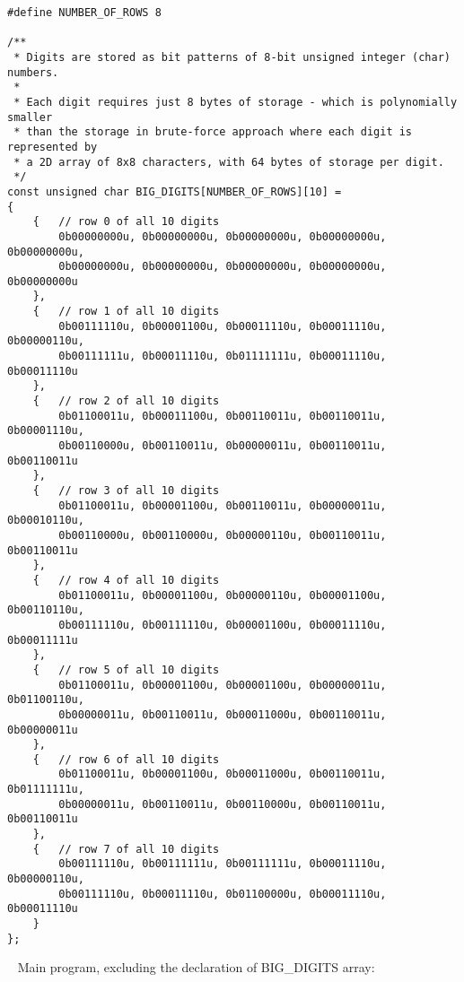 \documentclass{article}
\begin{document}
	\begin{verbatim}
#define NUMBER_OF_ROWS 8

/**
 * Digits are stored as bit patterns of 8-bit unsigned integer (char) numbers.
 *
 * Each digit requires just 8 bytes of storage - which is polynomially smaller
 * than the storage in brute-force approach where each digit is represented by
 * a 2D array of 8x8 characters, with 64 bytes of storage per digit.
 */
const unsigned char BIG_DIGITS[NUMBER_OF_ROWS][10] = 
{
    {   // row 0 of all 10 digits
        0b00000000u, 0b00000000u, 0b00000000u, 0b00000000u, 0b00000000u,
        0b00000000u, 0b00000000u, 0b00000000u, 0b00000000u, 0b00000000u
    },
    {   // row 1 of all 10 digits
        0b00111110u, 0b00001100u, 0b00011110u, 0b00011110u, 0b00000110u,
        0b00111111u, 0b00011110u, 0b01111111u, 0b00011110u, 0b00011110u
    },
    {   // row 2 of all 10 digits
        0b01100011u, 0b00011100u, 0b00110011u, 0b00110011u, 0b00001110u,
        0b00110000u, 0b00110011u, 0b00000011u, 0b00110011u, 0b00110011u
    },
    {   // row 3 of all 10 digits
        0b01100011u, 0b00001100u, 0b00110011u, 0b00000011u, 0b00010110u,
        0b00110000u, 0b00110000u, 0b00000110u, 0b00110011u, 0b00110011u
    },
    {   // row 4 of all 10 digits
        0b01100011u, 0b00001100u, 0b00000110u, 0b00001100u, 0b00110110u,
        0b00111110u, 0b00111110u, 0b00001100u, 0b00011110u, 0b00011111u
    },
    {   // row 5 of all 10 digits
        0b01100011u, 0b00001100u, 0b00001100u, 0b00000011u, 0b01100110u,
        0b00000011u, 0b00110011u, 0b00011000u, 0b00110011u, 0b00000011u
    },
    {   // row 6 of all 10 digits
        0b01100011u, 0b00001100u, 0b00011000u, 0b00110011u, 0b01111111u,
        0b00000011u, 0b00110011u, 0b00110000u, 0b00110011u, 0b00110011u
    },
    {   // row 7 of all 10 digits
        0b00111110u, 0b00111111u, 0b00111111u, 0b00011110u, 0b00000110u,
        0b00111110u, 0b00011110u, 0b01100000u, 0b00011110u, 0b00011110u
    }
};
	\end{verbatim}
	
	\rmfamily\
	\newline
	\noindent Main program, excluding the declaration of BIG_DIGITS array:
	
\end{document}
